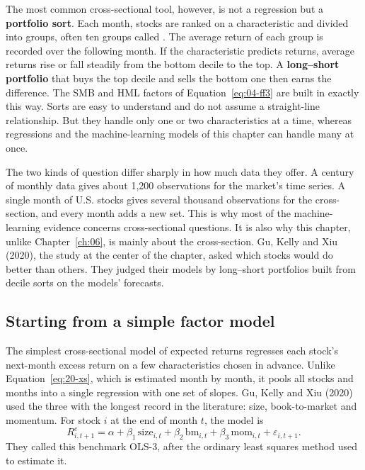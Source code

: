The most common cross-sectional tool, however, is not a regression but a \textbf{portfolio sort}. Each month, stocks are ranked on a characteristic and divided into groups, often ten groups called . The average return of each group is recorded over the following month. If the characteristic predicts returns, average returns rise or fall steadily from the bottom decile to the top. A \textbf{long--short portfolio} that buys the top decile and sells the bottom one then earns the difference. The SMB and HML factors of Equation~\eqref{eq:04-ff3} are built in exactly this way. Sorts are easy to understand and do not assume a straight-line relationship. But they handle only one or two characteristics at a time, whereas regressions and the machine-learning models of this chapter can handle many at once.

The two kinds of question differ sharply in how much data they offer. A century of monthly data gives about 1,200 observations for the market's time series. A single month of U.S. stocks gives several thousand observations for the cross-section, and every month adds a new set. This is why most of the machine-learning evidence concerns cross-sectional questions. It is also why this chapter, unlike Chapter~\ref{ch:06}, is mainly about the cross-section. Gu, Kelly and Xiu (2020), the study at the center of the chapter, asked which stocks would do better than others. They judged their models by long--short portfolios built from decile sorts on the models' forecasts.

\subsection{Starting from a simple factor model}
\label{sec:20-simple}

The simplest cross-sectional model of expected returns regresses each stock's next-month excess return on a few characteristics chosen in advance. Unlike Equation~\eqref{eq:20-xs}, which is estimated month by month, it pools all stocks and months into a single regression with one set of slopes. Gu, Kelly and Xiu (2020) used the three with the longest record in the literature: size, book-to-market and momentum. For stock $i$ at the end of month $t$, the model is
\begin{equation}
  R^{e}_{i,t+1} = \alpha + \beta_1\,\text{size}_{i,t} + \beta_2\,\text{bm}_{i,t} + \beta_3\,\text{mom}_{i,t} + \varepsilon_{i,t+1}.
  \label{eq:20-ols3}
\end{equation}
They called this benchmark OLS-3, after the ordinary least squares method used to estimate it.

